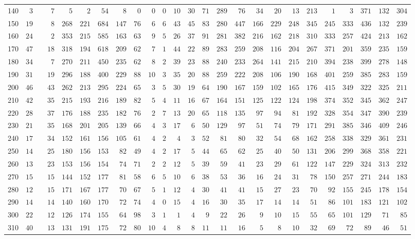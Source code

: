 \begin{sidewaystable}[!tbp]
\begin{center}
\begin{tabular}{lrcrrrrrrrrrrrrrrrrrrrrrr}
140&$ 3$&&$ 7$&$  5$&$  2$&$ 54$&$  8$&$  0$&$ 0$&$ 0$&$10$&$30$&$71$&$289$&$ 76$&$ 34$&$ 20$&$ 13$&$213$&$  1$&$  3$&$371$&$132$&$304$\tabularnewline
150&$19$&&$ 8$&$268$&$221$&$684$&$147$&$ 76$&$ 6$&$ 6$&$43$&$45$&$83$&$280$&$447$&$166$&$229$&$248$&$345$&$245$&$333$&$436$&$132$&$239$\tabularnewline
160&$24$&&$ 2$&$353$&$215$&$585$&$163$&$ 63$&$ 9$&$ 5$&$26$&$37$&$91$&$281$&$382$&$216$&$162$&$218$&$310$&$333$&$257$&$424$&$213$&$162$\tabularnewline
170&$47$&&$18$&$318$&$194$&$618$&$209$&$ 62$&$ 7$&$ 1$&$44$&$22$&$89$&$283$&$259$&$208$&$116$&$204$&$267$&$371$&$201$&$359$&$235$&$159$\tabularnewline
180&$34$&&$ 7$&$270$&$211$&$450$&$235$&$ 62$&$ 8$&$ 2$&$39$&$23$&$88$&$240$&$233$&$264$&$141$&$215$&$210$&$394$&$238$&$399$&$278$&$148$\tabularnewline
190&$31$&&$19$&$296$&$188$&$400$&$229$&$ 88$&$10$&$ 3$&$35$&$20$&$88$&$259$&$222$&$208$&$106$&$190$&$168$&$401$&$259$&$385$&$283$&$159$\tabularnewline
200&$46$&&$43$&$262$&$213$&$295$&$224$&$ 65$&$ 3$&$ 5$&$30$&$19$&$64$&$190$&$167$&$159$&$102$&$165$&$176$&$415$&$349$&$322$&$325$&$211$\tabularnewline
210&$42$&&$35$&$215$&$193$&$216$&$189$&$ 82$&$ 5$&$ 4$&$11$&$16$&$67$&$164$&$151$&$125$&$122$&$124$&$198$&$374$&$352$&$345$&$362$&$247$\tabularnewline
220&$28$&&$37$&$176$&$188$&$235$&$182$&$ 76$&$ 2$&$ 7$&$13$&$20$&$65$&$118$&$135$&$ 97$&$ 94$&$ 81$&$192$&$328$&$354$&$347$&$390$&$239$\tabularnewline
230&$21$&&$35$&$168$&$201$&$205$&$139$&$ 66$&$ 4$&$ 3$&$17$&$ 6$&$50$&$129$&$ 97$&$ 51$&$ 74$&$ 79$&$171$&$291$&$385$&$346$&$409$&$246$\tabularnewline
240&$17$&&$34$&$152$&$161$&$156$&$105$&$ 61$&$ 4$&$ 2$&$ 4$&$ 3$&$52$&$ 81$&$ 80$&$ 32$&$ 54$&$ 68$&$162$&$258$&$338$&$329$&$361$&$231$\tabularnewline
250&$14$&&$25$&$180$&$156$&$153$&$ 82$&$ 49$&$ 4$&$ 2$&$17$&$ 5$&$44$&$ 65$&$ 62$&$ 25$&$ 40$&$ 50$&$131$&$206$&$299$&$368$&$358$&$221$\tabularnewline
260&$13$&&$23$&$153$&$156$&$154$&$ 74$&$ 71$&$ 2$&$ 2$&$12$&$ 5$&$39$&$ 59$&$ 41$&$ 23$&$ 29$&$ 61$&$122$&$147$&$229$&$324$&$313$&$232$\tabularnewline
270&$15$&&$15$&$144$&$152$&$177$&$ 81$&$ 58$&$ 6$&$ 5$&$10$&$ 6$&$38$&$ 53$&$ 36$&$ 16$&$ 24$&$ 31$&$ 78$&$150$&$257$&$271$&$244$&$183$\tabularnewline
280&$12$&&$15$&$171$&$167$&$177$&$ 70$&$ 67$&$ 5$&$ 1$&$12$&$ 4$&$30$&$ 41$&$ 41$&$ 15$&$ 27$&$ 23$&$ 70$&$ 92$&$155$&$245$&$178$&$154$\tabularnewline
290&$14$&&$14$&$140$&$160$&$170$&$ 72$&$ 74$&$ 4$&$ 0$&$15$&$ 4$&$16$&$ 30$&$ 35$&$ 17$&$ 14$&$ 14$&$ 51$&$ 86$&$101$&$183$&$121$&$102$\tabularnewline
300&$22$&&$12$&$126$&$174$&$155$&$ 64$&$ 98$&$ 3$&$ 1$&$ 1$&$ 4$&$ 9$&$ 22$&$ 26$&$  9$&$ 10$&$ 15$&$ 55$&$ 65$&$101$&$129$&$ 71$&$ 85$\tabularnewline
310&$40$&&$13$&$131$&$191$&$175$&$ 72$&$ 80$&$10$&$ 4$&$ 8$&$ 8$&$11$&$ 11$&$ 16$&$  5$&$  8$&$ 10$&$ 32$&$ 69$&$ 72$&$ 89$&$ 46$&$ 51$\tabularnewline

\end{tabular}
\end{center}
\end{sidewaystable}
